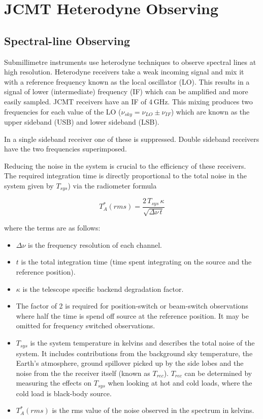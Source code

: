 \documentclass[twoside,11pt]{article}
\newcommand{\xlabel}[1]{}
\renewcommand{\_}{\texttt{\symbol{95}}}
\begin{document}
\clearpage
\section{\xlabel{het_overview}JCMT Heterodyne Observing}
\label{sec:het}
\subsection{\xlabel{specline}Spectral-line Observing}
Submillimetre instruments use heterodyne techniques to observe spectral lines at high resolution. Heterodyne receivers take a weak incoming signal and mix it with a reference frequency known as the local oscillator (LO). This results in a signal of lower (intermediate) frequency (IF) which can be amplified and more easily sampled. JCMT receivers have an IF of 4\,GHz. This mixing produces two frequencies for each value of the LO ($\nu_{sky} = \nu_{LO}\pm\nu_{IF}$) which are known as the upper sideband (USB) and lower sideband (LSB). 

In a single sideband receiver one of these is suppressed. Double sideband receivers have the two frequencies superimposed.

Reducing the noise in the system is crucial to the efficiency of these receivers. The required integration time is directly proportional to the total noise in the system given by $T_{sys}$) via the radiometer formula

\[T_A^*(rms) = \frac{2\,T_{sys}\,\kappa}{\sqrt{\Delta\nu\,t}}\]

where the terms are as follows:
\begin{itemize}
\item $\Delta\nu$ is the frequency resolution of each channel.

\item $t$ is the total integration time (time spent integrating on the source and the reference position).

\item $\kappa$ is the telescope specific backend degradation factor. 

\item The factor of 2 is required for  position-switch or beam-switch observations where half the time is spend off source at the reference position. It may be omitted for frequency switched observations.

\item $T_{sys}$ is the  system temperature in kelvins and describes the total noise of the system. It includes contributions from the background sky temperature, the Earth's atmosphere, ground spillover picked up by the side lobes and the noise from the the receiver itself (known as $T_{rec}$).  $T_{rec}$ can be determined by measuring the effects on $T_{sys}$ when looking at hot and  cold loads, where the cold load is black-body source.
\item $T^*_{A}(rms)$ is the rms value of the noise observed in the spectrum in kelvins. 
\end{itemize}
\end{document}
